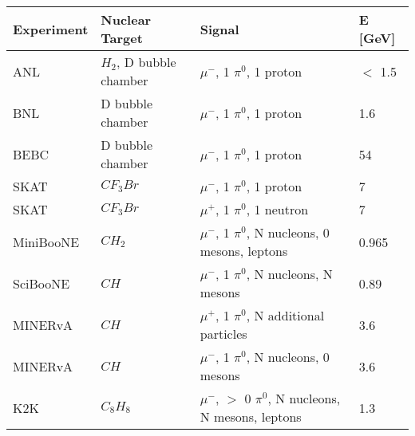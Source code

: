 \begin{table*} 
 \centering
 \begin{tabular}{| l | l | l | l |}
  \hline
   Experiment & Nuclear Target & Signal & E [GeV]\\ [0.1ex] \hline
 ANL \cite{bib:ANL1} & $H_2$, D bubble chamber & $\mu^-$, 1 $\pi^0$, 1 proton & $<$ 1.5 \\ 
 BNL \cite{bib:ANL2} & D bubble chamber & $\mu^-$, 1 $\pi^0$, 1 proton & 1.6 \\ 
 BEBC \cite{bib:HE_unknown1} & D bubble chamber & $\mu^-$, 1 $\pi^0$, 1 proton & 54 \\ 
 SKAT \cite{bib:HE_unknown2} & $CF_{3}Br$ & $\mu^-$, 1 $\pi^0$, 1 proton & 7 \\ 
 SKAT \cite{bib:HE_unknown2} & $CF_{3}Br$ & $\mu^+$, 1 $\pi^0$, 1 neutron & 7 \\ 
 MiniBooNE \cite{bib:miniboone_thesis} & $CH_2$ & $\mu^-$, 1 $\pi^0$, N nucleons, 0 mesons, leptons & 0.965 \\ 
 SciBooNE \cite{bib:sciboone_thesis} & $CH$ & $\mu^-$, 1 $\pi^0$, N nucleons, N mesons  & 0.89 \\
  MINERvA \cite{bib:minerva_thesis} & $CH$ & $\mu^+$, 1 $\pi^0$, N additional particles & 3.6 \\ 
  MINERvA \cite{bib:minerva_paper_2017} & $CH$ & $\mu^-$, 1 $\pi^0$, N nucleons, 0 mesons & 3.6 \\ 
 K2K \cite{bib:k2k_paper} & $C_{8}H_{8}$ & $\mu^-$, $>$ 0 $\pi^0$, N nucleons, N mesons, leptons & 1.3 \\ 
\hline

\end{tabular}
\end{table*}

